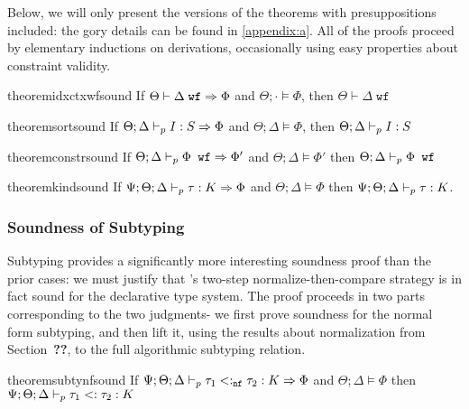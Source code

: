 Below, we will only present the versions of the theorems with presuppositions included: the gory details can be found in \autoref{appendix:a}. All of the proofs proceed by elementary inductions on derivations, occasionally using easy properties about constraint validity.

\begin{restatable}{theorem}{idxctxwfsound}
If $\Theta \vdash \Delta \; \texttt{wf} \Rightarrow \Phi$ and $\Theta ; \cdot \vDash \Phi$, then $\Theta \vdash \Delta \; \texttt{wf}$
\label{thm:idx-ctx-wf-sound}
\end{restatable}

\begin{restatable}{theorem}{sortsound}
If $\Theta;\Delta \vdash_p I : S \Rightarrow \Phi$ and $\Theta;\Delta \vDash \Phi$, then $\Theta;\Delta \vdash_p I : S$ 
\label{thm:sort-sound}
\end{restatable}

\begin{restatable}{theorem}{constrsound}
If $\Theta ; \Delta \vdash_p \Phi \texttt{ wf} \Rightarrow \Phi'$ and $\Theta ; \Delta \vDash \Phi'$ then $\Theta ; \Delta \vdash_p \Phi \texttt{ wf}$
\label{thm:constr-sound}
\end{restatable}

\begin{restatable}{theorem}{kindsound}
If $\Psi ; \Theta ; \Delta \vdash_p \tau : K \Rightarrow \Phi$ and $\Theta ; \Delta \vDash \Phi$ then $\Psi ; \Theta ; \Delta \vdash_p \tau : K$.
\label{thm:kind-sound}
\end{restatable}

\subsubsection{Soundness of Subtyping}
Subtyping provides a significantly more interesting soundness proof than the prior cases: we must justify that \bilambdaamor's two-step normalize-then-compare strategy is in fact sound for the declarative type system. The proof proceeds in two parts corresponding to the two judgments- we first prove soundness for the normal form subtyping, and then lift it, using the results about normalization from Section~\textbf{??}, to the full algorithmic subtyping relation.

\begin{restatable}{theorem}{subtynfsound}
If $\Psi ; \Theta ; \Delta \vdash_p \tau_1 <:_{\texttt{nf}} \tau_2 : K \Rightarrow \Phi$ and $\Theta ; \Delta \vDash \Phi$ then $\Psi ; \Theta ; \Delta \vdash_p \tau_1 <: \tau_2 : K$
\label{thm:subtynf-sound}
\end{restatable}

